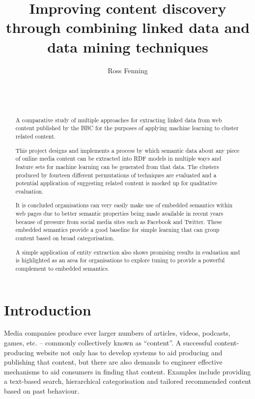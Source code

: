 \documentclass{sig-alternate-05-2015}
\begin{document}
\title{Improving content discovery through combining linked data and data mining techniques}

\author{
\alignauthor
Ross Fenning\\
       \\
       \\
       \\
}

\maketitle
\begin{abstract}
A comparative study of multiple approaches for extracting linked data
from web content published by the BBC for the purposes of applying
machine learning to cluster related content.

This project designs and implements a process by which semantic data
about any piece of online media content can be extracted into RDF
models in
multiple ways and feature
sets for machine learning can be generated from
that data. The clusters produced by fourteen different permutations
of techniques are evaluated and a potential application of suggesting
related content is mocked up for qualitative evaluation.

It is concluded organisations can very easily make use of
embedded semantics within web pages due to better semantic properties
being made available in recent years because of pressure from
social media sites such as Facebook and Twitter.
These embedded semantics provide a good baseline for simple
learning that can group content based on broad categorisation.

A simple application of entity extraction also shows promising results in
evaluation and is highlighted as an area for organisations to explore
tuning to provide a powerful complement to embedded semantics.
\end{abstract}

\section{Introduction}

Media companies produce ever larger numbers of articles, videos, podcasts,
games, etc. -- commonly collectively known as ``content''. A successful
content-producing website not only has to develop systems to aid producing and
publishing that content, but there are also demands to engineer effective
mechanisms to aid consumers in finding that content. Examples include providing a
text-based search, hierarchical
categorisation and tailored recommended
content based on past behaviour.
\end{document}
